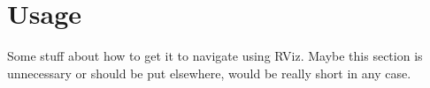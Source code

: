 \chapter{Usage}

Some stuff about how to get it to navigate using RViz. Maybe this section is unnecessary or should be put elsewhere, would be really short in any case.

